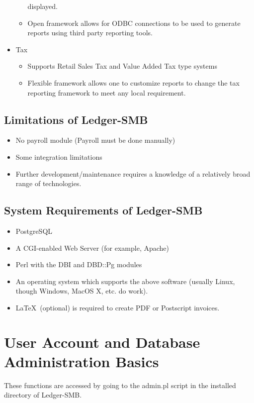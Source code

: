 \documentclass{article}
\begin{document}
\begin{itemize}
\begin{itemize}
	displayed.
  \item Open framework allows for ODBC connections to be used to generate
	reports using third party reporting tools.
  \end{itemize}
\item Tax
  \begin{itemize}
  \item Supports Retail Sales Tax and Value Added Tax type systems
  \item Flexible framework allows one to customize reports to change the tax
	reporting framework to meet any local requirement.
  \end{itemize}
\end{itemize}

\subsection{Limitations of Ledger-SMB}
\begin{itemize}
\item No payroll module (Payroll must be done manually)
\item Some integration limitations
\item Further development/maintenance requires a knowledge of a relatively 
	broad range of technologies.
\end{itemize}

\subsection{System Requirements of Ledger-SMB}
\begin{itemize}
\item PostgreSQL
\item A CGI-enabled Web Server (for example, Apache)
\item Perl with the DBI and DBD::Pg modules
\item An operating system which supports the above software (usually Linux, 
	though Windows, MacOS X, etc. do work).
\item \LaTeX\ (optional) is required to create PDF or Postscript invoices.
\end{itemize}

\section{User Account and Database Administration Basics}

These functions are accessed by going to the admin.pl script in the installed
directory of Ledger-SMB.
\end{document}

